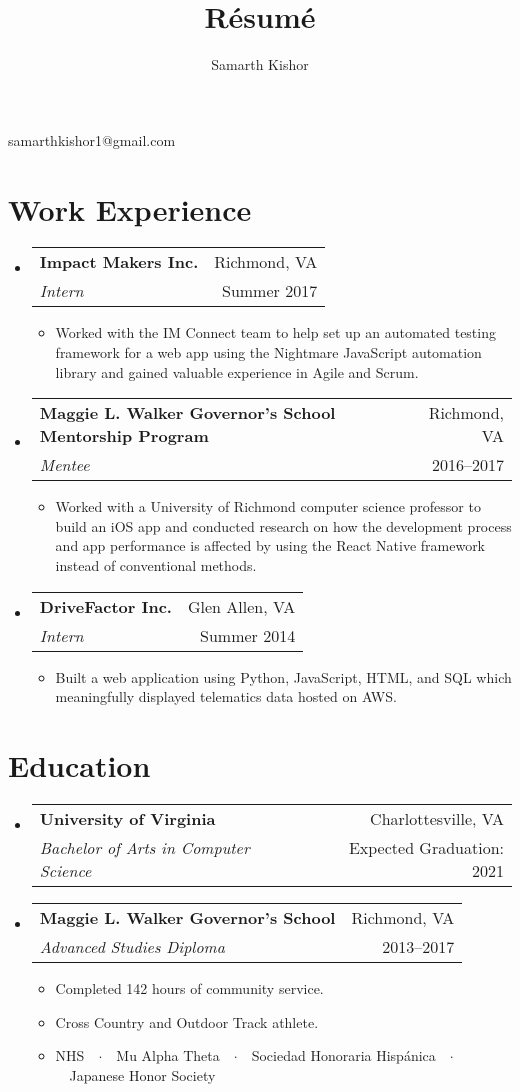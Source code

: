 \documentclass{article}
\makeatletter
\renewcommand{\maketitle}{
\begin{center}
{\huge\bfseries\theauthor}

\vspace{0.25em}

samarthkishor1@gmail.com

\end{center}}
\newcommand{\resumeSubHeadingListStart}{\begin{itemize}[leftmargin=*]}
\newcommand{\resumeSubHeadingListEnd}{\end{itemize}}
\newcommand{\workSubheading}[5]{
\item
\begin{tabular*}{\textwidth}{l@{\extracolsep{\fill}}r}
\textbf{\large#1} & {\small #2} \\
\textit{#3} & {#4}
\end{tabular*}
\vspace{-1em}
\begin{itemize}
\item #5
\end{itemize}
\vspace{0.25em}}
\newcommand{\eduSubheading}[4]{
\item
\begin{tabular*}{\textwidth}{l@{\extracolsep{\fill}}r}
\textbf{\large#1} & {\small #2} \\
\textit{#3} & {#4}
\end{tabular*}}
\makeatother
\begin{document}
\title{R\'esum\'e}
\author{Samarth Kishor}

\maketitle


\section{Work Experience}

\resumeSubHeadingListStart
\workSubheading{Impact Makers Inc.}{Richmond, VA}
{Intern}{Summer 2017}
{Worked with the IM Connect team to help set up an automated testing framework for a web app using the Nightmare JavaScript automation library and gained valuable experience in Agile and Scrum.}

\workSubheading{Maggie L. Walker Governor's School Mentorship Program}{Richmond, VA}
{Mentee}{2016--2017}
{Worked with a University of Richmond computer science professor to build an iOS app and conducted research on how the development process and app performance is affected by using the React Native framework instead of conventional methods.}

\workSubheading{DriveFactor Inc.}{Glen Allen, VA}
{Intern}{Summer 2014}
{Built a web application using Python, JavaScript, HTML, and SQL which meaningfully displayed telematics data hosted on AWS.}
\resumeSubHeadingListEnd


\vspace{-1.5em}
\section{Education}

\resumeSubHeadingListStart
\eduSubheading{University of Virginia}{Charlottesville, VA}
{Bachelor of Arts in Computer Science}{Expected Graduation: 2021}

\eduSubheading{Maggie L. Walker Governor's School}{Richmond, VA}
{Advanced Studies Diploma}{2013--2017}
\vspace{-1em}
\begin{itemize}
\item Completed 142 hours of community service.
\item Cross Country and Outdoor Track athlete.
\item NHS\ \ $\cdotp$\ \ Mu Alpha Theta\ \ $\cdotp$\ \ Sociedad Honoraria Hisp\'anica\ \ $\cdotp$\ \ Japanese Honor Society
\end{itemize}
\resumeSubHeadingListEnd
\end{document}
